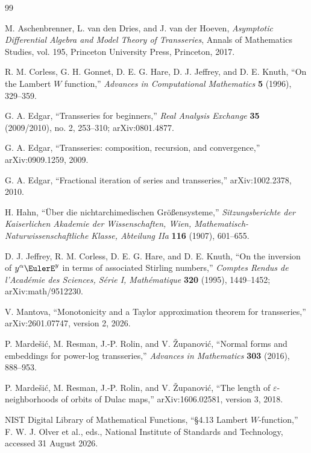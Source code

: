 \documentclass[11pt,openany]{book}
\theoremstyle{definition}
\theoremstyle{plain}
\theoremstyle{remark}
\begin{document}
\begin{thebibliography}{99}

M. Aschenbrenner, L. van den Dries, and J. van der Hoeven,
\emph{Asymptotic Differential Algebra and Model Theory of Transseries},
Annals of Mathematics Studies, vol. 195,
Princeton University Press, Princeton, 2017.

R. M. Corless, G. H. Gonnet, D. E. G. Hare, D. J. Jeffrey, and D. E. Knuth,
``On the Lambert \(W\) function,''
\emph{Advances in Computational Mathematics} \textbf{5} (1996), 329--359.

G. A. Edgar,
``Transseries for beginners,''
\emph{Real Analysis Exchange} \textbf{35} (2009/2010), no. 2, 253--310;
arXiv:0801.4877.

G. A. Edgar,
``Transseries: composition, recursion, and convergence,''
arXiv:0909.1259, 2009.

G. A. Edgar,
``Fractional iteration of series and transseries,''
arXiv:1002.2378, 2010.

H. Hahn,
``\"Uber die nichtarchimedischen Gr\"o\ss ensysteme,''
\emph{Sitzungsberichte der Kaiserlichen Akademie der Wissenschaften, Wien,
Mathematisch-Naturwissenschaftliche Klasse, Abteilung IIa}
\textbf{116} (1907), 601--655.

D. J. Jeffrey, R. M. Corless, D. E. G. Hare, and D. E. Knuth,
``On the inversion of \(y^\alpha \EulerE^y\) in terms of associated Stirling numbers,''
\emph{Comptes Rendus de l'Acad\'emie des Sciences, S\'erie I, Math\'ematique}
\textbf{320} (1995), 1449--1452;
arXiv:math/9512230.

V. Mantova,
``Monotonicity and a Taylor approximation theorem for transseries,''
arXiv:2601.07747, version 2, 2026.

P. Marde\v{s}i\'c, M. Resman, J.-P. Rolin, and V. \v{Z}upanovi\'c,
``Normal forms and embeddings for power-log transseries,''
\emph{Advances in Mathematics} \textbf{303} (2016), 888--953.

P. Marde\v{s}i\'c, M. Resman, J.-P. Rolin, and V. \v{Z}upanovi\'c,
``The length of \(\varepsilon\)-neighborhoods of orbits of Dulac maps,''
arXiv:1606.02581, version 3, 2018.

NIST Digital Library of Mathematical Functions,
``\S4.13 Lambert \(W\)-function,''
F. W. J. Olver et al., eds., National Institute of Standards and Technology,
accessed 31 August 2026.


\end{thebibliography}
\end{document}
